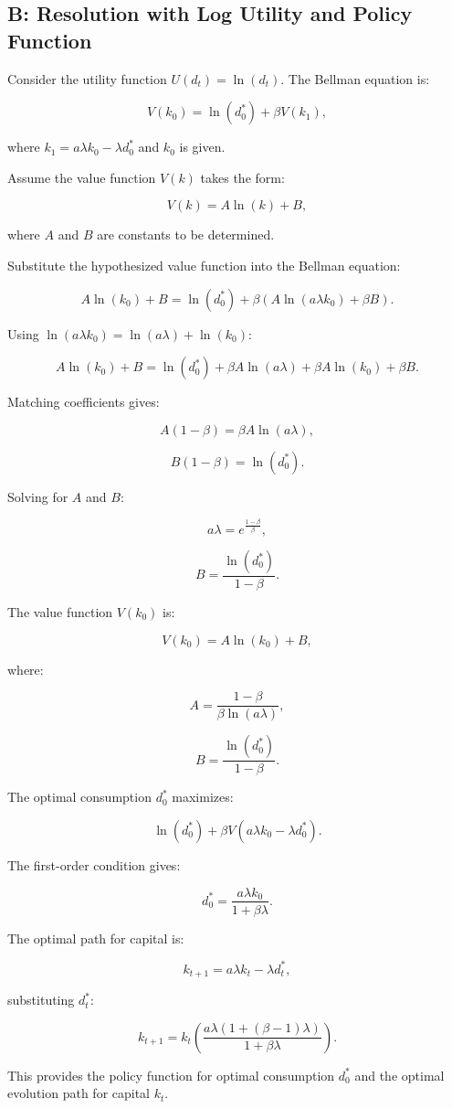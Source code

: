 \subsection{B: Resolution with Log Utility and Policy Function}

  Consider the utility function \( U(d_t) = \ln(d_t) \). The Bellman equation is:
  
  \[
  V(k_0) = \ln(d_0^*) + \beta V(k_1),
  \]
  
  where \( k_1 = a \lambda k_0 - \lambda d_0^* \) and \( k_0 \) is given.
  
  Assume the value function \( V(k) \) takes the form:
  
  \[
  V(k) = A \ln(k) + B,
  \]
  
  where \( A \) and \( B \) are constants to be determined.
  
  Substitute the hypothesized value function into the Bellman equation:
  
  \[
  A \ln(k_0) + B = \ln(d_0^*) + \beta (A \ln(a \lambda k_0) + \beta B).
  \]
  
  Using \( \ln(a \lambda k_0) = \ln(a \lambda) + \ln(k_0) \):
  
  \[
  A \ln(k_0) + B = \ln(d_0^*) + \beta A \ln(a \lambda) + \beta A \ln(k_0) + \beta B.
  \]
  
  Matching coefficients gives:
  
  \[
  A (1 - \beta) = \beta A \ln(a \lambda),
  \]
  
  \[
  B (1 - \beta) = \ln(d_0^*).
  \]
  
  Solving for \( A \) and \( B \):
  
  \[
  a \lambda = e^{\frac{1 - \beta}{\beta}},
  \]
  
  \[
  B = \frac{\ln(d_0^*)}{1 - \beta}.
  \]
  
  The value function \( V(k_0) \) is:
  
  \[
  V(k_0) = A \ln(k_0) + B,
  \]
  
  where:
  
  \[
  A = \frac{1 - \beta}{\beta \ln(a \lambda)},
  \]
  
  \[
  B = \frac{\ln(d_0^*)}{1 - \beta}.
  \]
  
  The optimal consumption \( d_0^* \) maximizes:
  
  \[
  \ln(d_0^*) + \beta V(a \lambda k_0 - \lambda d_0^*).
  \]
  
  The first-order condition gives:
  
  \[
  d_0^* = \frac{a \lambda k_0}{1 + \beta \lambda}.
  \]
  
  The optimal path for capital is:
  
  \[
  k_{t+1} = a \lambda k_t - \lambda d_t^*,
  \]
  
  substituting \( d_t^* \):
  
  \[
  k_{t+1} = k_t \left( \frac{a \lambda (1 + (\beta - 1) \lambda)}{1 + \beta \lambda} \right).
  \]
  
  This provides the policy function for optimal consumption \( d_0^* \) and the optimal evolution path for capital \( k_t \).
  